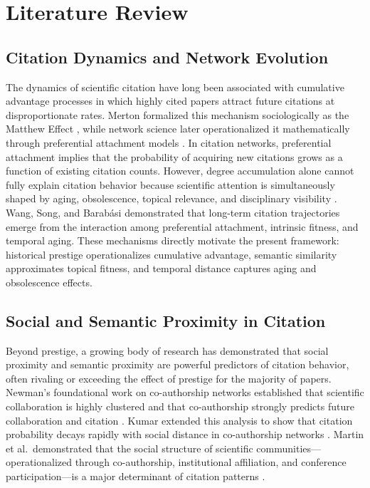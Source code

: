 \documentclass[11pt,a4paper]{article}
\begin{document}
\section{Literature Review}
\label{sec:lit}

\subsection{Citation Dynamics and Network Evolution}

The dynamics of scientific citation have long been associated with cumulative advantage processes in which highly cited papers attract future citations at disproportionate rates. Merton formalized this mechanism sociologically as the Matthew Effect \citep{merton1968matthew}, while network science later operationalized it mathematically through preferential attachment models \citep{barabasi1999emergence}. In citation networks, preferential attachment implies that the probability of acquiring new citations grows as a function of existing citation counts. However, degree accumulation alone cannot fully explain citation behavior because scientific attention is simultaneously shaped by aging, obsolescence, topical relevance, and disciplinary visibility \citep{price1965networks}. Wang, Song, and Barab\'asi \citep{wang2013quantifying} demonstrated that long-term citation trajectories emerge from the interaction among preferential attachment, intrinsic fitness, and temporal aging. These mechanisms directly motivate the present framework: historical prestige operationalizes cumulative advantage, semantic similarity approximates topical fitness, and temporal distance captures aging and obsolescence effects.

\subsection{Social and Semantic Proximity in Citation}

Beyond prestige, a growing body of research has demonstrated that social proximity and semantic proximity are powerful predictors of citation behavior, often rivaling or exceeding the effect of prestige for the majority of papers. Newman's foundational work on co-authorship networks established that scientific collaboration is highly clustered and that co-authorship strongly predicts future collaboration and citation \citep{newman2004coauthorship}. Kumar extended this analysis to show that citation probability decays rapidly with social distance in co-authorship networks \citep{kumar2015co}. Martin et al.\ demonstrated that the social structure of scientific communities---operationalized through co-authorship, institutional affiliation, and conference participation---is a major determinant of citation patterns \citep{martin2013coauthorship}.
\end{document}
